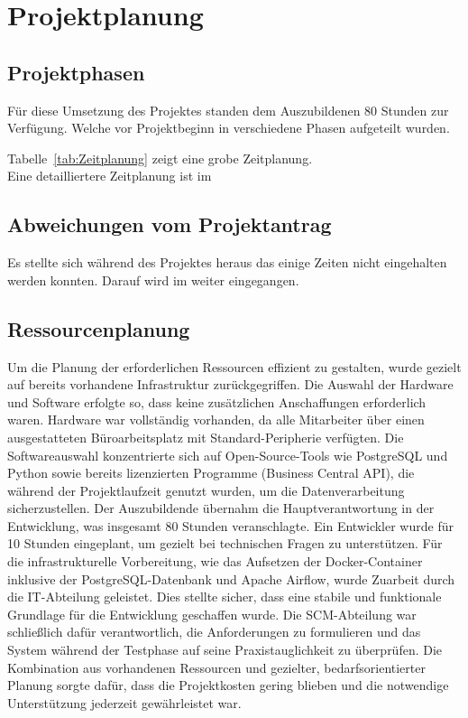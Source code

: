 \section{Projektplanung} 

\subsection{Projektphasen}
\label{sec:Projektphasen}
Für diese Umsetzung des Projektes standen dem Auszubildenen 80 Stunden zur Verfügung. 
Welche vor Projektbeginn in verschiedene Phasen aufgeteilt wurden. 

Tabelle~\ref{tab:Zeitplanung} zeigt eine grobe Zeitplanung.
\\

Eine detailliertere Zeitplanung ist im 

\clearpage


\subsection{Abweichungen vom Projektantrag}
\label{sec:Abweichung Projektantrag}
Es stellte sich während des Projektes heraus das einige Zeiten nicht eingehalten werden konnten. 
Darauf wird im  weiter eingegangen.


\subsection{Ressourcenplanung}
\label{sec:Ressourcenplanung}
Um die Planung der erforderlichen Ressourcen effizient zu gestalten, wurde gezielt auf bereits vorhandene Infrastruktur zurückgegriffen. Die Auswahl der Hardware und Software erfolgte so, dass keine zusätzlichen Anschaffungen erforderlich waren. Hardware war vollständig vorhanden, da alle Mitarbeiter über einen ausgestatteten Büroarbeitsplatz mit Standard-Peripherie verfügten. Die Softwareauswahl konzentrierte sich auf Open-Source-Tools wie PostgreSQL und Python sowie bereits lizenzierten Programme (Business Central API), die während der Projektlaufzeit genutzt wurden, um die Datenverarbeitung sicherzustellen.
Der Auszubildende übernahm die Hauptverantwortung in der Entwicklung, was insgesamt 80 Stunden veranschlagte. Ein Entwickler wurde für 10 Stunden eingeplant, um gezielt bei technischen Fragen zu unterstützen. Für die infrastrukturelle Vorbereitung, wie das Aufsetzen der Docker-Container inklusive der PostgreSQL-Datenbank und Apache Airflow, wurde Zuarbeit durch die IT-Abteilung geleistet. Dies stellte sicher, dass eine stabile und funktionale Grundlage für die Entwicklung geschaffen wurde.
Die SCM-Abteilung war schließlich dafür verantwortlich, die Anforderungen zu formulieren und das System während der Testphase auf seine Praxistauglichkeit zu überprüfen. Die Kombination aus vorhandenen Ressourcen und gezielter, bedarfsorientierter Planung sorgte dafür, dass die Projektkosten gering blieben und die notwendige Unterstützung jederzeit gewährleistet war.



